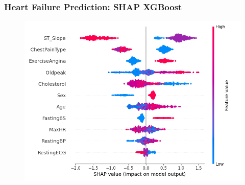 \documentclass{beamer}
\begin{document}
\begin{frame}
\frametitle{Heart Failure Prediction: SHAP XGBoost}
\begin{figure}[H]
 \centering
 \includegraphics[scale=0.4]{shap_lgbm_heart.png}
\end{figure}
\end{frame}
\end{document}
